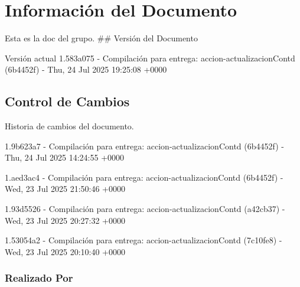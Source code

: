\documentclass[
	a4paper, %
	12pt, %
]{include/CSSullivanBusinessReport}
\begin{document}
\newpage

\begin{twothirdswidth} %
	\tableofcontents %
\end{twothirdswidth}

\newpage


\newpage

\section{Información del
Documento}\label{sec:informaciuxf3n-del-documento}

Esta es la doc del grupo. \#\# Versión del Documento

\begin{quote}
\end{quote}

Versión actual 1.583a075 - Compilación para entrega:
accion-actualizacionContd (6b4452f) - Thu, 24 Jul 2025 19:25:08 +0000

\subsection{Control de Cambios}\label{sec:control-de-cambios}

Historia de cambios del documento.

1.9b623a7 - Compilación para entrega: accion-actualizacionContd
(6b4452f) - Thu, 24 Jul 2025 14:24:55 +0000

1.aed3ac4 - Compilación para entrega: accion-actualizacionContd
(6b4452f) - Wed, 23 Jul 2025 21:50:46 +0000

1.93d5526 - Compilación para entrega: accion-actualizacionContd
(a42cb37) - Wed, 23 Jul 2025 20:27:32 +0000

1.53054a2 - Compilación para entrega: accion-actualizacionContd
(7c10fe8) - Wed, 23 Jul 2025 20:10:40 +0000

\subsubsection{Realizado Por}\label{sec:realizado-por}
\end{document}
